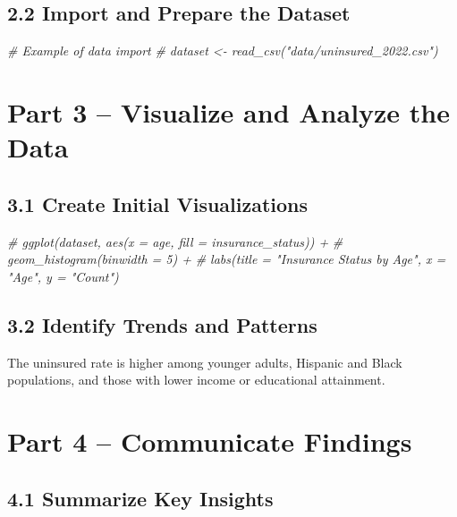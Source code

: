 \documentclass[
]{article}
\newenvironment{Shaded}{\begin{snugshade}}{\end{snugshade}}
\newcommand{\CommentTok}[1]{\textcolor[rgb]{0.56,0.35,0.01}{\textit{#1}}}
\begin{document}
\subsection{2.2 Import and Prepare the
Dataset}\label{import-and-prepare-the-dataset}

\begin{Shaded}
\begin{Highlighting}[]
\CommentTok{\# Example of data import}
\CommentTok{\# dataset \textless{}{-} read\_csv("data/uninsured\_2022.csv")}
\end{Highlighting}
\end{Shaded}

\section{Part 3 -- Visualize and Analyze the
Data}\label{part-3-visualize-and-analyze-the-data}

\subsection{3.1 Create Initial
Visualizations}\label{create-initial-visualizations}

\begin{Shaded}
\begin{Highlighting}[]
\CommentTok{\# ggplot(dataset, aes(x = age, fill = insurance\_status)) +}
\CommentTok{\#   geom\_histogram(binwidth = 5) +}
\CommentTok{\#   labs(title = "Insurance Status by Age", x = "Age", y = "Count")}
\end{Highlighting}
\end{Shaded}

\subsection{3.2 Identify Trends and
Patterns}\label{identify-trends-and-patterns}

The uninsured rate is higher among younger adults, Hispanic and Black
populations, and those with lower income or educational attainment.

\section{Part 4 -- Communicate
Findings}\label{part-4-communicate-findings}

\subsection{4.1 Summarize Key Insights}\label{summarize-key-insights}
\end{document}
